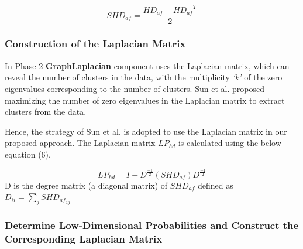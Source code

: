     \begin{equation}
         SHD_{af} = \frac{HD_{af} + {HD_{af}}^T}{2}
    \end{equation}

\subsubsection{Construction of the Laplacian Matrix}
In Phase 2 \textbf{ GraphLaplacian} component uses the Laplacian matrix, which can reveal the number of clusters in the data, with the multiplicity \textit{`k'} of the zero eigenvalues corresponding to the number of clusters. Sun et al. \cite{sun2023laplacian} proposed maximizing the number of zero eigenvalues in the Laplacian matrix to extract clusters from the data.

Hence, the strategy of Sun et al. \cite{sun2023laplacian} is adopted to use the Laplacian matrix in our proposed approach. The Laplacian matrix $LP_{hd}$ is calculated using the below equation (6). 

\begin{equation}
    LP_{hd} = I - D^{\frac{-1}{2}} (SHD_{af}) D^{\frac{-1}{2}} 
\end{equation}
    D is the degree matrix (a diagonal matrix) of $SHD_{af}$ defined as $D_{ii} = \sum_{j} {SHD_{af}}_{ij}$


\subsubsection{Determine Low-Dimensional Probabilities and Construct the Corresponding Laplacian Matrix}

